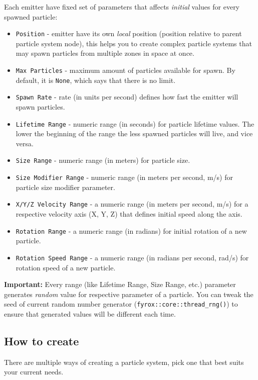 \documentclass[
]{book}
\providecommand{\tightlist}{%
  \setlength{\itemsep}{0pt}\setlength{\parskip}{0pt}}
\theoremstyle{definition}
\theoremstyle{definition}
\theoremstyle{definition}
\theoremstyle{definition}
\theoremstyle{remark}
\begin{document}
Each emitter have fixed set of parameters that affects \emph{initial} values for every spawned particle:

\begin{itemize}
\tightlist
\item
  \texttt{Position} - emitter have its own \emph{local} position (position relative to parent particle system node), this helps you to create complex particle systems that may spawn particles from multiple zones in space at once.
\item
  \texttt{Max\ Particles} - maximum amount of particles available for spawn. By default, it is \texttt{None}, which says that there is no limit.
\item
  \texttt{Spawn\ Rate} - rate (in units per second) defines how fast the emitter will spawn particles.
\item
  \texttt{Lifetime\ Range} - numeric range (in seconds) for particle lifetime values. The lower the beginning of the range the less spawned particles will live, and vice versa.
\item
  \texttt{Size\ Range} - numeric range (in meters) for particle size.
\item
  \texttt{Size\ Modifier\ Range} - numeric range (in meters per second, m/s) for particle size modifier parameter.
\item
  \texttt{X/Y/Z\ Velocity\ Range} - a numeric range (in meters per second, m/s) for a respective velocity axis (X, Y, Z) that defines initial speed along the axis.
\item
  \texttt{Rotation\ Range} - a numeric range (in radians) for initial rotation of a new particle.
\item
  \texttt{Rotation\ Speed\ Range} - a numeric range (in radians per second, rad/s) for rotation speed of a new particle.
\end{itemize}

\textbf{Important:} Every range (like Lifetime Range, Size Range, etc.) parameter generates \emph{random} value for respective parameter of a particle. You can tweak the seed of current random number generator (\texttt{fyrox::core::thread\_rng()}) to ensure that generated values will be different each time.

\subsection{How to create}\label{how-to-create-5}

There are multiple ways of creating a particle system, pick one that best suits your current needs.
\end{document}
